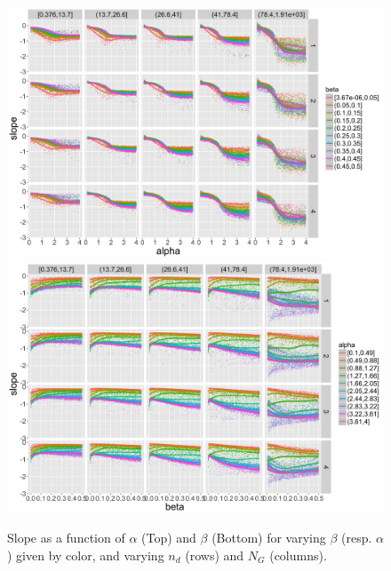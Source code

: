 \begin{figure}
\centering
\includegraphics[width=\textwidth]{figuresraw/slope_alpha}
\includegraphics[width=\textwidth]{figuresraw/slope_beta}
\caption{Slope as a function of $\alpha$ (Top) and $\beta$ (Bottom) for varying $\beta$ (resp. $\alpha$) given by color, and varying $n_d$ (rows) and $N_G$ (columns).}
\label{fig:slope}
\end{figure}


